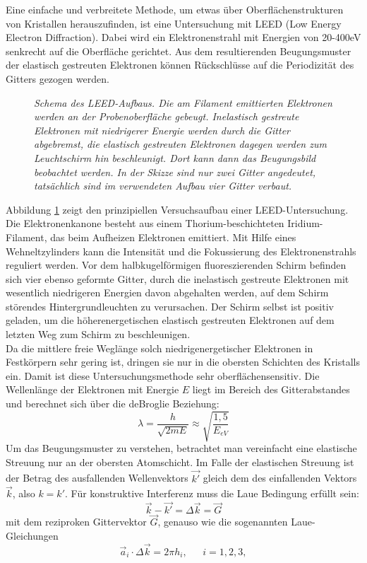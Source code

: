 \FloatBarrier

Eine einfache und verbreitete Methode, um etwas über Oberflächenstrukturen von
 Kristallen herauszufinden, ist eine Untersuchung mit LEED (Low Energy Electron
 Diffraction).
 Dabei wird ein Elektronenstrahl mit Energien von 20-400eV senkrecht auf die
 Oberfläche gerichtet. Aus dem resultierenden
 Beugungsmuster der elastisch gestreuten Elektronen können Rückschlüsse auf die Periodizität des Gitters
 gezogen werden.


 \begin{figure}[H]
	\centering
	\sffamily 
	
	\caption{\textit{Schema des LEED-Aufbaus. Die am Filament emittierten Elektronen werden an der
	Probenoberfläche gebeugt. Inelastisch gestreute Elektronen mit niedrigerer Energie werden durch die
	Gitter abgebremst, die elastisch gestreuten Elektronen dagegen werden zum Leuchtschirm
	hin beschleunigt. Dort kann dann das Beugungsbild beobachtet werden. In der Skizze sind nur zwei
	Gitter angedeutet, tatsächlich sind im verwendeten Aufbau vier Gitter verbaut.}}
	\label{leedaufbau}
\end{figure}




 Abbildung \ref{leedaufbau} zeigt den prinzipiellen Versuchsaufbau einer LEED-Untersuchung. Die
 Elektronenkanone besteht aus einem Thorium-beschichteten Iridium-Filament, das beim Aufheizen
 Elektronen emittiert. Mit Hilfe eines Wehneltzylinders kann die Intensität und die Fokussierung
 des Elektronenstrahls reguliert werden. Vor dem halbkugelförmigen fluoreszierenden Schirm befinden
 sich vier ebenso geformte Gitter, durch die inelastisch gestreute Elektronen mit wesentlich
 niedrigeren Energien davon abgehalten werden, auf dem Schirm störendes Hintergrundleuchten zu
 verursachen. Der Schirm selbst ist positiv geladen, um die höherenergetischen elastisch gestreuten
 Elektronen auf dem letzten Weg zum Schirm zu beschleunigen.\\
  Da die mittlere freie Weglänge solch niedrigenergetischer Elektronen in
 Festkörpern sehr gering ist, dringen sie nur in die obersten Schichten des
 Kristalls ein. Damit ist diese Untersuchungsmethode sehr oberflächensensitiv.
 Die Wellenlänge der Elektronen mit Energie $E$ liegt im Bereich des Gitterabstandes und
 berechnet sich über die deBroglie Beziehung:
 \[\lambda=\frac{h}{\sqrt{2mE}}\approx \sqrt{\frac{1{,}5}{E_{eV}}}\]
Um das Beugungsmuster zu verstehen, betrachtet man vereinfacht eine elastische
Streuung nur an der obersten Atomschicht. Im Falle der elastischen Streuung ist
der Betrag des ausfallenden Wellenvektors $\vec{k'}$ gleich dem des
einfallenden Vektors $\vec{k}$, also $k=k'$. Für konstruktive Interferenz
muss die Laue Bedingung erfüllt sein:
\[\vec{k}-\vec{k'}=\Delta \vec{k}=\vec{G}\]
mit dem reziproken Gittervektor $\vec{G}$, genauso wie die sogenannten Laue-Gleichungen
\[\vec{a}_i\cdot \Delta \vec{k}=2\pi h_i,~~~~~~~i=1, 2, 3,\]

